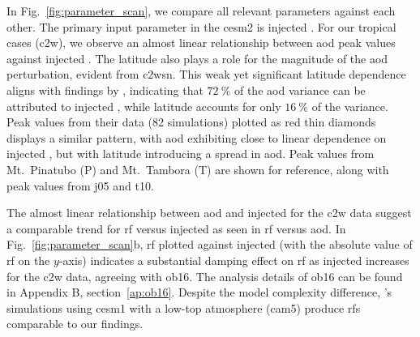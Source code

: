 \documentclass{ametsocV6.1}
\newcommand{\iso}[1][i]{{#1}njected \ce{SO2}}
\begin{document}
In Fig.~\ref{fig:parameter_scan}, we compare all relevant parameters against each other.
The primary input parameter in the \gls{cesm2} is \iso{}. For our tropical cases
(\gls{c2w}), we observe an almost linear relationship between \gls{aod} peak values
against \iso{}. The latitude also plays a role for the magnitude of the \gls{aod}
perturbation, evident from \gls{c2wsn}. This weak yet significant latitude dependence
aligns with findings by \citet{marshall2019}, indicating that \(\SI{72}{\percent}\) of
the \gls{aod} variance can be attributed to \iso{}, while latitude accounts for only
\(\SI{16}{\percent}\) of the variance. Peak values from their data (82 simulations)
plotted as red thin diamonds displays a similar pattern, with \gls{aod} exhibiting close
to linear dependence on \iso{}, but with latitude introducing a spread in \gls{aod}.
Peak values from Mt.\ Pinatubo (P) and Mt.\ Tambora (T) are shown for reference, along
with peak values from \gls{j05} and \gls{t10}.

The almost linear relationship between \gls{aod} and \iso{} for the \gls{c2w} data
suggest a comparable trend for \gls{rf} versus \iso{} as seen in \gls{rf} versus
\gls{aod}. In Fig.~\ref{fig:parameter_scan}b, \gls{rf} plotted against \iso{} (with the
absolute value of \gls{rf} on the \(y\)-axis) indicates a substantial damping effect on
\gls{rf} as \iso{} increases for the \gls{c2w} data, agreeing with \gls{ob16}. The
analysis details of \gls{ob16} can be found in Appendix B, section~\ref{ap:ob16}.
Despite the model complexity difference, \citet{ottobliesner2016}'s simulations using
\gls{cesm1} with a low-top atmosphere (\gls{cam5}) produce \glspl{rf} comparable to our
findings.
\end{document}
